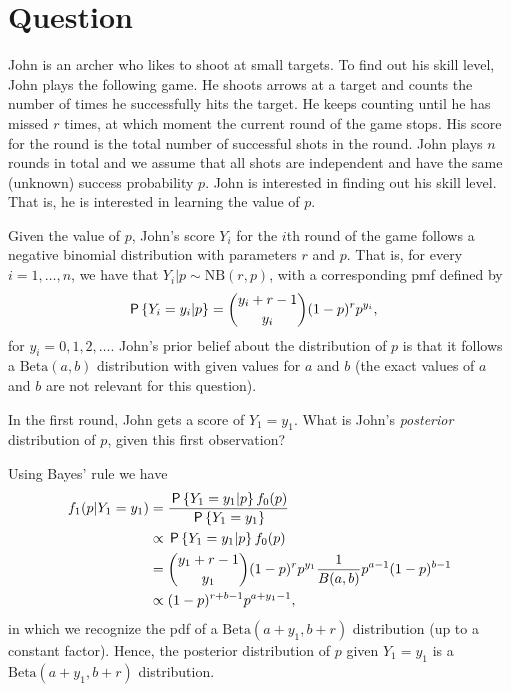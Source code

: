 \section*{Question}

John is an archer who likes to shoot at small targets. To find out his skill level, John plays the following game. He shoots arrows at a target and counts the number of times he successfully hits the target. He keeps counting until he has missed $r$ times, at which moment the current round of the game stops. His score for the round is the total number of successful shots in the round. John plays $n$ rounds in total and we assume that all shots are independent and have the same (unknown) success probability $p$. John is interested in finding out his skill level. That is, he is interested in learning the value of $p$.

Given the value of $p$, John's score $Y_i$ for the $i$th round of the game follows a negative binomial distribution with parameters $r$ and $p$. That is, for every $i=1,\ldots,n$, we have that $Y_i|p \sim \text{NB}(r,p)$, with a corresponding pmf defined by
\begin{align}
    \P{Y_i = y_i | p} &= {y_i + r - 1 \choose y_i} (1 - p)^r p^{y_i},
\end{align}
for $y_i = 0,1,2,\ldots$. John's prior belief about the distribution of $p$ is that it follows a $\text{Beta}(a,b)$ distribution with given values for $a$ and $b$ (the exact values of $a$ and $b$ are not relevant for this question).

\begin{exercise}[2.5]
In the first round, John gets a score of $Y_1 = y_1$. What is John's \textit{posterior} distribution of $p$, given this first observation?
\begin{solution}
Using Bayes' rule we have
\begin{align}
    f_1(p|Y_1 = y_1) &= \frac{\P{Y_1 = y_1 | p} f_0(p)}{\P{Y_1 = y_1}} \\
    &\propto \P{Y_1 = y_1 | p} f_0(p) \\
    &= {y_1 + r - 1 \choose y_1} (1 - p)^r p^{y_1} \frac{1}{B(a,b)} p^{a-1} (1-p)^{b-1} \\
    &\propto (1 - p)^{r+b-1} p^{a+y_1-1},
\end{align}
in which we recognize the pdf of a $\text{Beta}(a+y_1, b + r)$ distribution (up to a constant factor). Hence, the posterior distribution of $p$ given $Y_1 = y_1$ is a $\text{Beta}(a+y_1, b + r)$ distribution.
\end{solution}
\end{exercise}

